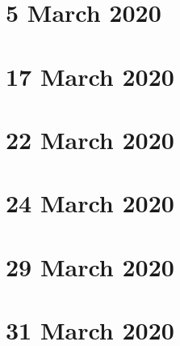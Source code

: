 \documentclass[twoside]{report}
\begin{document}
    \chapter{5 March 2020}
    \chapter{17 March 2020}
    \chapter{22 March 2020}
    \chapter{24 March 2020}
    \chapter{29 March 2020}
    \chapter{31 March 2020}
\end{document}
